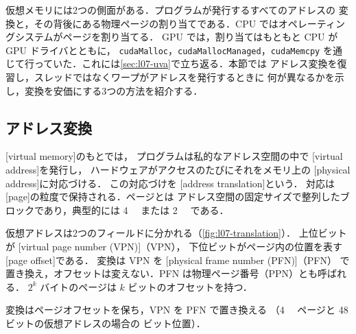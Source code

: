 \documentclass[../main.tex]{subfiles}
\begin{document}
仮想メモリには2つの側面がある．プログラムが発行するすべてのアドレスの
変換と，その背後にある物理ページの割り当てである．CPU ではオペレーティングシステムがページを割り当てる．
GPU では，割り当てはもともと CPU が GPU ドライバとともに，
\texttt{cudaMalloc}，\texttt{cudaMallocManaged}，\texttt{cudaMemcpy}
を通じて行っていた．これには\cref{sec:l07-uva}で立ち返る．本節では
アドレス変換を復習し，スレッドではなくワープがアドレスを発行するときに
何が異なるかを示し，変換を安価にする3つの方法を紹介する．

\subsection{アドレス変換}

\begin{definition}[仮想メモリ]
  \label{def:l07-vm}
  [virtual memory]のもとでは，
  プログラムは私的なアドレス空間の中で
  [virtual address]を発行し，
  ハードウェアがアクセスのたびにそれをメモリ上の
  [physical address]に対応づける．
  この対応づけを
  [address translation]という．
  対応は[page]の粒度で保持される．ページとは
  アドレス空間の固定サイズで整列したブロックであり，典型的には
  \SI{4}{\kibi\byte} または \SI{2}{\mebi\byte} である．
\end{definition}

仮想アドレスは2つのフィールドに分かれる（\cref{fig:l07-translation}）．
上位ビットが
[virtual page number (VPN)]（VPN），
下位ビットがページ内の位置を表す
[page offset]である．
変換は VPN を
[physical frame number (PFN)]（PFN）
で置き換え，オフセットは変えない．PFN は物理ページ番号（PPN）とも呼ばれる．
$2^k$ バイトのページは $k$ ビットのオフセットを持つ．

\begin{marginfigure}
  
  \caption{変換はページオフセットを保ち，VPN を PFN で置き換える
    （\SI{4}{\kibi\byte} ページと 48 ビットの仮想アドレスの場合の
    ビット位置）．}
  \label{fig:l07-translation}
\end{marginfigure}
\end{document}
